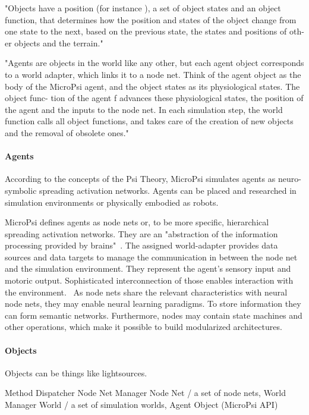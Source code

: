 "Objects have a position (for instance ), a set of object states and an object function, that determines how the position and states of the object change from one state to the next, based on the previous state, the states and positions of oth- er objects and the terrain."

"Agents are objects in the world like any other, but each agent object corresponds to
a world adapter, which links it to a node net. Think of the agent object as the body of
the MicroPsi agent, and the object states as its physiological states. The object func-
tion of the agent f advances these physiological states, the position of the agent
and the inputs to the node net.
In each simulation step, the world function calls all object functions, and takes care
of the creation of new objects and the removal of obsolete ones."

        \paragraph{Agents}
        
According to the concepts of the Psi Theory, MicroPsi simulates agents as neuro-symbolic spreading activation networks. Agents can be placed and researched in simulation environments or physically embodied as robots.~\cite{conf/agi/Bach12}
        
MicroPsi defines agents as node nets or, to be more specific, hierarchical spreading activation networks. They are an "abstraction of the information processing provided by brains"~\cite{conf/agi/Bach12}. The assigned world-adapter provides data sources and data targets to manage the communication in between the node net and the simulation environment. They represent the agent's sensory input and motoric output. Sophisticated interconnection of those enables interaction with the environment.~\cite{conf/agi/Bach12}
As node nets share the relevant characteristics with neural node nets, they may enable neural learning paradigms. To store information they can form semantic networks. Furthermore, nodes may contain state machines and other operations, which make it possible to build modularized architectures.

        \paragraph{Objects}
Objects can be things like lightsources.
 
    Method Dispatcher
    Node Net Manager
        Node Net / a set of node nets,
    World Manager
        World / a set of simulation worlds,
            Agent
            Object
    (MicroPsi API)
    




